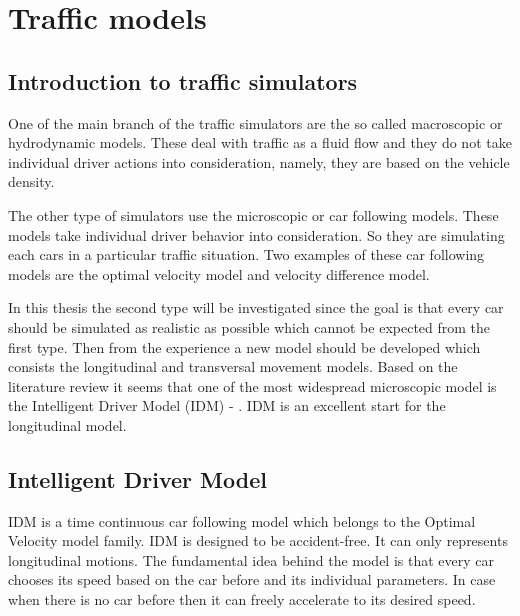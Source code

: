 \chapter{Traffic models}
	\section{Introduction to traffic simulators}
		One of the main branch of the traffic simulators are the so called macroscopic or hydrodynamic models. These deal with traffic as a fluid flow and they do not take individual driver actions into consideration, namely, they are based on the vehicle density.

		The other type of simulators use the microscopic or car following models. These models take individual driver behavior into consideration. So they are simulating each cars in a particular traffic situation. Two examples of these car following models are the optimal velocity model and velocity difference model.

		In this thesis the second type will be investigated since the goal is that every car should be simulated as realistic as possible which cannot be expected from the first type. Then from the experience a new  model should be developed which consists the longitudinal and transversal movement models. Based on the literature review it seems that one of the most widespread microscopic model is the Intelligent Driver Model (IDM) \cite{arne1} - \cite{modified}. IDM is an excellent start for the longitudinal model.
	\section{Intelligent Driver Model} \label{sec:IDM}
		IDM is a time continuous car following model which belongs to the Optimal Velocity model family. IDM is designed to be accident-free. It can only represents longitudinal motions. The fundamental idea behind the model is that every car chooses its speed based on the car before and its individual parameters. In case when there is no car before then it can freely accelerate to its desired speed.

